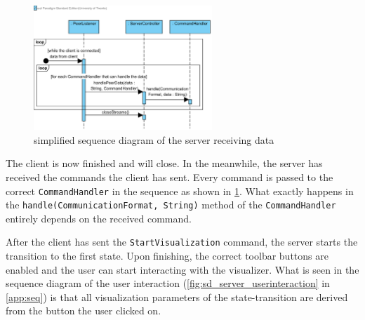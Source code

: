 \begin{figure}[ht]
  \centering
  \includegraphics[width=0.6\textwidth]{diagrams/SD_server_receivecommand}
  \caption{simplified sequence diagram of the server receiving data}\label{fig:sd_server_receivecommand}
\end{figure}
\par The client is now finished and will close. In the meanwhile, the server has received the commands the client has sent. Every command is passed to the correct \lstinline{CommandHandler} in the sequence as shown in \cref{fig:sd_server_receivecommand}. What exactly happens in the \lstinline{handle(CommunicationFormat, String)} method of the \lstinline{CommandHandler} entirely depends on the received command.
\par After the client has sent the \lstinline{StartVisualization} command, the server starts the transition to the first state. Upon finishing, the correct toolbar buttons are enabled and the user can start interacting with the visualizer. What is seen in the sequence diagram of the user interaction (\cref{fig:sd_server_userinteraction} in \cref{app:seq}) is that all visualization parameters of the state-transition are derived from the button the user clicked on.
